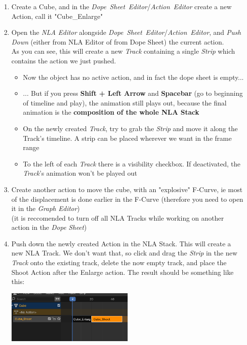 \documentclass{article}
\begin{document}
\begin{mdframed}[linewidth=2pt, linecolor=gray, roundcorner=1pt, innermargin=2pt, outermargin=2pt]
    \begin{enumerate}[topsep=0pt, noitemsep]
        \item Create a Cube, and in the \mbox{\textit{Dope Sheet Editor}/\textit{Action Editor}} create a new Action, call it \mbox{"Cube\_Enlarge"}
        \item Open the \textit{NLA Editor} alongside \mbox{\textit{Dope Sheet Editor}/\textit{Action Editor}}, and \textit{Push Down} (either from NLA Editor of from Dope Sheet) the current action.\\
        As you can see, this will create a new \textit{Track} containing a single \textit{Strip} which contains the action we just pushed.
        \begin{itemize}[noitemsep, topsep=0pt]
            \item Now the object has no active action, and in fact the dope sheet is empty...
            \item ... But if you press \textbf{Shift + Left Arrow} and \textbf{Spacebar} (go to beginning of timeline and play), the animation still plays out, because the final animation is the 
              \textbf{composition of the whole NLA Stack}
            \item On the newly created \textit{Track}, try to grab the \textit{Strip} and move it along the Track's timeline. A strip can be placed wherever we want in the frame range
            \item To the left of each \textit{Track} there is a visibility checkbox. If deactivated, the \textit{Track}'s animation won't be played out
        \end{itemize}
        \item Create another action to move the cube, with an "explosive" F-Curve, ie most of the displacement is done earlier in the F-Curve (therefore you need to open it in the \textit{Graph Editor})\\
          (it is reccomended to turn off all NLA Tracks while working on another action in the \textit{Dope Sheet})
        \item Push down the newly created Action in the NLA Stack. This will create a new NLA Track. We don't want that, so click and drag the \textit{Strip} in the new \textit{Track} onto the 
        existing track, delete the now empty track, and place the Shoot Action after the Enlarge action. The result should be something like this:
        \begin{center}
            \includegraphics[width=0.5\textwidth]{blender_docs_images/my_nla_example.png}

\end{center}
\end{enumerate}
\end{mdframed}
\end{document}
